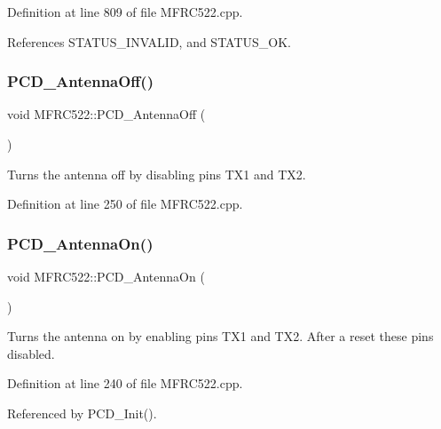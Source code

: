 Definition at line 809 of file M\+F\+R\+C522.\+cpp.



References S\+T\+A\+T\+U\+S\+\_\+\+I\+N\+V\+A\+L\+ID, and S\+T\+A\+T\+U\+S\+\_\+\+OK.

\mbox{\label{class_m_f_r_c522_a2098ebe85700109b20c5026643f1dad7}} 
\subsubsection{\texorpdfstring{P\+C\+D\+\_\+\+Antenna\+Off()}{PCD\_AntennaOff()}}
{\footnotesize\ttfamily void M\+F\+R\+C522\+::\+P\+C\+D\+\_\+\+Antenna\+Off (\begin{DoxyParamCaption}{ }\end{DoxyParamCaption})}

Turns the antenna off by disabling pins T\+X1 and T\+X2. 

Definition at line 250 of file M\+F\+R\+C522.\+cpp.

\mbox{\label{class_m_f_r_c522_a044be037a5f172e9cea7d8ce1dcf32e0}} 
\subsubsection{\texorpdfstring{P\+C\+D\+\_\+\+Antenna\+On()}{PCD\_AntennaOn()}}
{\footnotesize\ttfamily void M\+F\+R\+C522\+::\+P\+C\+D\+\_\+\+Antenna\+On (\begin{DoxyParamCaption}{ }\end{DoxyParamCaption})}

Turns the antenna on by enabling pins T\+X1 and T\+X2. After a reset these pins disabled. 

Definition at line 240 of file M\+F\+R\+C522.\+cpp.



Referenced by P\+C\+D\+\_\+\+Init().

\mbox{\label{class_m_f_r_c522_a26469f6295cd9796e0bb781c48036971}} 
